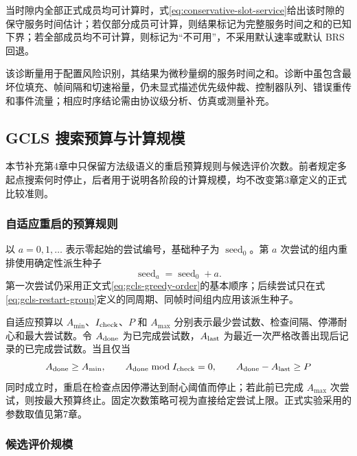 \documentclass[UTF8,a4paper,twoside,zihao=-4]{ctexart}
\numberwithin{equation}{section}
\numberwithin{figure}{section}
\numberwithin{table}{section}
\theoremstyle{definition}
\numberwithin{algocf}{section}
\begin{document}
当时隙内全部正式成员均可计算时，式\eqref{eq:conservative-slot-service}给出该时隙的保守服务时间估计；若仅部分成员可计算，则结果标记为完整服务时间之和的已知下界；若全部成员均不可计算，则标记为“不可用”，不采用默认速率或默认 BRS 回退。

该诊断量用于配置风险识别，其结果为微秒量纲的服务时间之和。诊断中虽包含最坏位填充、帧间隔和切速裕量，仍未显式描述优先级仲裁、控制器队列、错误重传和事件流量；相应时序结论需由协议级分析、仿真或测量补充。

\subsection{GCLS 搜索预算与计算规模}
\label{subsec:appendix-gcls-budget-scale}

本节补充第4章中只保留方法级语义的重启预算规则与候选评价次数。前者规定多起点搜索何时停止，后者用于说明各阶段的计算规模，均不改变第3章定义的正式比较准则。

\subsubsection{自适应重启的预算规则}
\label{subsubsec:appendix-gcls-restart-budget}

以 $a=0,1,\ldots$ 表示零起始的尝试编号，基础种子为 $\operatorname{seed}_0$。第 $a$ 次尝试的组内重排使用确定性派生种子
\begin{equation}
 \operatorname{seed}_a
 =
 \operatorname{seed}_0+a.
\label{eq:gcls-restart-seed}
\end{equation}
第一次尝试仍采用正文式\eqref{eq:gcls-greedy-order}的基本顺序；后续尝试只在式\eqref{eq:gcls-restart-group}定义的同周期、同帧时间组内应用该派生种子。

自适应预算以 $A_{\min}$、$I_{\rm check}$、$P$ 和 $A_{\max}$ 分别表示最少尝试数、检查间隔、停滞耐心和最大尝试数。令 $A_{\rm done}$ 为已完成尝试数，$A_{\rm last}$ 为最近一次严格改善出现后记录的已完成尝试数。当且仅当
\begin{equation}
 A_{\rm done}\ge A_{\min},
 \qquad
 A_{\rm done}\bmod I_{\rm check}=0,
 \qquad
 A_{\rm done}-A_{\rm last}\ge P
\label{eq:gcls-adaptive-stop}
\end{equation}
同时成立时，重启在检查点因停滞达到耐心阈值而停止；若此前已完成 $A_{\max}$ 次尝试，则按最大预算终止。固定次数策略可视为直接给定尝试上限。正式实验采用的参数取值见第7章。

\subsubsection{候选评价规模}
\label{subsubsec:appendix-gcls-evaluation-scale}
\end{document}
